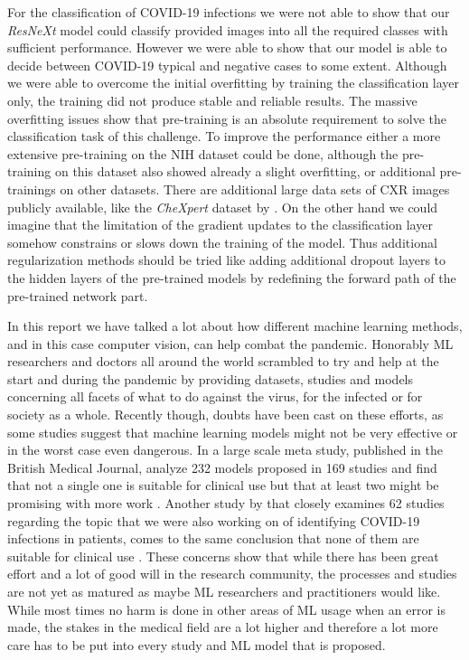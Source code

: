 For the classification of COVID-19 infections we were not able to show that our \textit{ResNeXt} model could classify provided images into all the required classes with sufficient performance. However we were able to show that our model is able to decide between COVID-19 typical and negative cases to some extent. Although we were able to overcome the initial overfitting by training the classification layer only, the training did not produce stable and reliable results. The massive overfitting issues show that pre-training is an absolute requirement to solve the classification task of this challenge. To improve the performance either a more extensive pre-training on the NIH dataset could be done, although the pre-training on this dataset also showed already a slight overfitting, or additional pre-trainings on other datasets. There are additional large data sets of \ac{CXR} images publicly available, like the \textit{CheXpert} dataset by \citeauthor{irvin2019chexpert} \autocite{irvin2019chexpert}. On the other hand we could imagine that the limitation of the gradient updates to the classification layer somehow constrains or slows down the training of the model. Thus additional regularization methods should be tried like adding additional dropout layers to the hidden layers of the pre-trained models by redefining the forward path of the pre-trained network part.

In this report we have talked a lot about how different machine learning methods, and in this case computer vision, can help combat the pandemic. Honorably ML researchers and doctors all around the world scrambled to try and help at the start and during the pandemic by providing datasets, studies and models concerning all facets of what to do against the virus, for the infected or for society as a whole. Recently though, doubts have been cast on these efforts, as some studies suggest that machine learning models might not be very effective or in the worst case even dangerous. In a large scale meta study, published in the British Medical Journal, \citeauthor{wynants_prediction_2020} analyze 232 models proposed in 169 studies and find that not a single one is suitable for clinical use but that at least two might be promising with more work \autocite{wynants_prediction_2020}. Another study by \citeauthor{aix-covnet_common_2021} that closely examines 62 studies regarding the topic that we were also working on of identifying COVID-19 infections in patients, comes to the same conclusion that none of them are suitable for clinical use \autocite{aix-covnet_common_2021}. These concerns show that while there has been great effort and a lot of good will in the research community, the processes and studies are not yet as matured as maybe ML researchers and practitioners would like. While most times no harm is done in other areas of ML usage when an error is made, the stakes in the medical field are a lot higher and therefore a lot more care has to be put into every study and ML model that is proposed.


